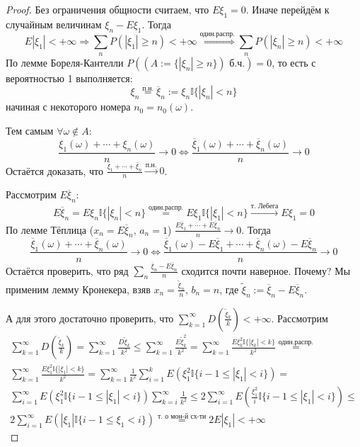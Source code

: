 \begin{proof}
	Без ограничения общности считаем, что $E\xi_1 = 0$. Иначе перейдём к случайным величинам $\xi_n - E\xi_1$. Тогда
	\[E|\xi_1| < +\infty \Rightarrow \sum_n P(|\xi_1| \geq n) < +\infty \stackrel{\text{один.распр.}}{\Leftrightarrow} \sum_n P(|\xi_n| \geq n) < +\infty\]
	По лемме Бореля-Кантелли $P((A:= \{|\xi_n| \geq n\}) \text{ б.ч.}) = 0$, то есть с вероятностью 1 выполняется:
	\[\xi_n \stackrel{\text{п.н.}}{=} \overline{\xi}_n := \xi_n\mathbb{I}\{|\xi_n| < n\}\]
	начиная с некоторого номера $n_0 = n_0(\omega)$.

	Тем самым $\forall \omega \not\in A$:
	\[\frac{\xi_1(\omega) + \cdots + \xi_n(\omega)}{n} \to 0 \Leftrightarrow \frac{\overline{\xi}_1(\omega) + \cdots + \overline{\xi}_n(\omega)}{n} \to 0\]
	Остаётся доказать, что $\frac{\overline{\xi}_1 + \cdots + \overline{\xi}_n}{n} \stackrel{\text{п.н.}}{\to} 0$.

	Рассмотрим $E\overline{\xi}_n$:
	\[E\overline{\xi}_n = E\xi_n\mathbb{I}\{|\xi_n| < n\} \stackrel{\text{один.распр.}}{=} E\xi_1\mathbb{I}\{|\xi_1| < n\} \stackrel{\text{т. Лебега}}{\to} E\xi_1 = 0\]
	По лемме Тёплица ($x_n = E\overline{\xi}_n,\, a_n = 1$) $\frac{E\overline{\xi}_1 + \cdots + E\overline{\xi}_n}{n} \to 0$. Тогда
	\[\frac{\overline{\xi}_1(\omega) + \cdots + \overline{\xi}_n(\omega)}{n} \to 0 \Leftrightarrow \frac{\overline{\xi}_1(\omega) - E\overline{\xi}_1 + \cdots + \overline{\xi}_n(\omega) - E\overline{\xi}_n}{n} \to 0\]
	Остаётся проверить, что ряд $\sum_n \frac{\overline{\xi}_n - E\overline{\xi}_n}{n}$ сходится почти наверное. Почему? Мы применим лемму Кронекера, взяв $x_n = \frac{\tilde{\xi}_n}{n},\, b_n = n$, где $\tilde{\xi}_n := \overline{\xi}_n - E\overline{\xi}_n$.

	А для этого достаточно проверить, что $\sum_{k = 1}^\infty D\left(\frac{\tilde{\xi}_k}{k}\right) < +\infty$. Рассмотрим
	\begin{align*}
		\sum_{k = 1}^\infty D\left(\frac{\tilde{\xi}_k}{k}\right) = \sum_{k = 1}^\infty \frac{D\tilde{\xi}_k}{k^2} \leq \sum_{k = 1}^\infty \frac{E\tilde{\xi}_k^2}{k^2} = \sum_{k = 1}^\infty \frac{E\xi_k^2\mathbb{I}\{|\xi_k| < k\}}{k^2} \stackrel{\text{один.распр.}}{=} \\
		\sum_{k = 1}^\infty \frac{E\xi_1^2\mathbb{I}\{|\xi_1| < k\}}{k^2} = \sum_{k = 1}^\infty \frac{1}{k^2}\sum_{i = 1}^k E\left(\xi_1^2\mathbb{I}\{i - 1 \leq |\xi_1| < i\}\right) =                                                                                                \\
		\sum_{i = 1}^\infty E\left(\xi_1^2\mathbb{I}\{i - 1 \leq |\xi_1| < i\}\right) \sum_{k = i}^\infty \frac{1}{k^2} \leq 2\sum_{i = 1}^\infty E\left(\frac{\xi_1^2}{i}\mathbb{I}\{i - 1 \leq |\xi_1| < i\}\right) \leq                                                             \\
		2 \sum_{i = 1}^\infty E(|\xi_1|\mathbb{I}\{i - 1 \leq \xi_1 < i\}) \stackrel{\text{т. о мон-й сх-ти}}{=} 2E|\xi_1| < +\infty
	\end{align*}
\end{proof}


